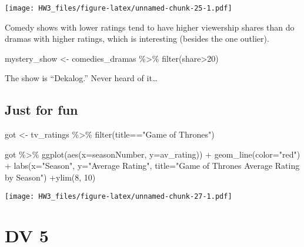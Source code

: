\documentclass[
]{article}
\newenvironment{Shaded}{\begin{snugshade}}{\end{snugshade}}
\newcommand{\AttributeTok}[1]{\textcolor[rgb]{0.77,0.63,0.00}{#1}}
\newcommand{\DecValTok}[1]{\textcolor[rgb]{0.00,0.00,0.81}{#1}}
\newcommand{\FunctionTok}[1]{\textcolor[rgb]{0.00,0.00,0.00}{#1}}
\newcommand{\NormalTok}[1]{#1}
\newcommand{\OtherTok}[1]{\textcolor[rgb]{0.56,0.35,0.01}{#1}}
\newcommand{\SpecialCharTok}[1]{\textcolor[rgb]{0.00,0.00,0.00}{#1}}
\newcommand{\StringTok}[1]{\textcolor[rgb]{0.31,0.60,0.02}{#1}}
\begin{document}
\texttt{[image: HW3\_files/figure-latex/unnamed-chunk-25-1.pdf]}

Comedy shows with lower ratings tend to have higher viewership shares
than do dramas with higher ratings, which is interesting (besides the
one outlier).

\begin{Shaded}
\begin{Highlighting}[]
\NormalTok{ mystery\_show }\OtherTok{\textless{}{-}}\NormalTok{ comedies\_dramas }\SpecialCharTok{\%\textgreater{}\%} 
  \FunctionTok{filter}\NormalTok{(share}\SpecialCharTok{\textgreater{}}\DecValTok{20}\NormalTok{) }
\end{Highlighting}
\end{Shaded}

The show is ``Dekalog.'' Never heard of it\ldots{}

\hypertarget{just-for-fun}{%
\subsection{Just for fun}\label{just-for-fun}}

\begin{Shaded}
\begin{Highlighting}[]
\NormalTok{got }\OtherTok{\textless{}{-}}\NormalTok{ tv\_ratings }\SpecialCharTok{\%\textgreater{}\%} 
  \FunctionTok{filter}\NormalTok{(title}\SpecialCharTok{==}\StringTok{"Game of Thrones"}\NormalTok{)}

\NormalTok{got }\SpecialCharTok{\%\textgreater{}\%} 
  \FunctionTok{ggplot}\NormalTok{(}\FunctionTok{aes}\NormalTok{(}\AttributeTok{x=}\NormalTok{seasonNumber,}
             \AttributeTok{y=}\NormalTok{av\_rating)) }\SpecialCharTok{+}
  \FunctionTok{geom\_line}\NormalTok{(}\AttributeTok{color=}\StringTok{"red"}\NormalTok{) }\SpecialCharTok{+}
  \FunctionTok{labs}\NormalTok{(}\AttributeTok{x=}\StringTok{"Season"}\NormalTok{,}
       \AttributeTok{y=}\StringTok{"Average Rating"}\NormalTok{,}
       \AttributeTok{title=}\StringTok{"Game of Thrones Average Rating by Season"}\NormalTok{) }\SpecialCharTok{+}\FunctionTok{ylim}\NormalTok{(}\DecValTok{8}\NormalTok{, }\DecValTok{10}\NormalTok{)}
\end{Highlighting}
\end{Shaded}

\texttt{[image: HW3\_files/figure-latex/unnamed-chunk-27-1.pdf]}

\hypertarget{dv-5}{%
\section{DV 5}\label{dv-5}}
\end{document}
